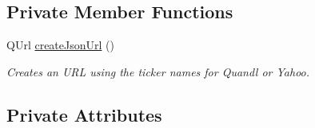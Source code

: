 \subsection*{Private Member Functions}
\begin{DoxyCompactItemize}
\item 
Q\+Url \hyperlink{class_json_query_adc17cbbe26433d97421ea81fb873b2f0}{create\+Json\+Url} ()
\begin{DoxyCompactList}\small\item\em Creates an U\+R\+L using the ticker names for Quandl or Yahoo. \end{DoxyCompactList}\end{DoxyCompactItemize}
\subsection*{Private Attributes}
